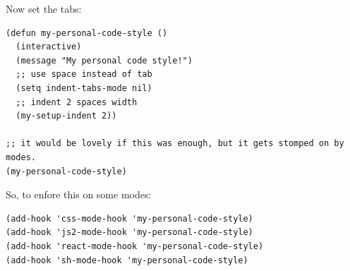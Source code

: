\documentclass[11pt]{article}
\begin{document}
Now set the tabs:

\begin{verbatim}
(defun my-personal-code-style ()
  (interactive)
  (message "My personal code style!")
  ;; use space instead of tab
  (setq indent-tabs-mode nil)
  ;; indent 2 spaces width
  (my-setup-indent 2))

;; it would be lovely if this was enough, but it gets stomped on by modes.
(my-personal-code-style)
\end{verbatim}

So, to enfore this on some modes:
\begin{verbatim}
(add-hook 'css-mode-hook 'my-personal-code-style)
(add-hook 'js2-mode-hook 'my-personal-code-style)
(add-hook 'react-mode-hook 'my-personal-code-style)
(add-hook 'sh-mode-hook 'my-personal-code-style)
\end{verbatim}
\end{document}

